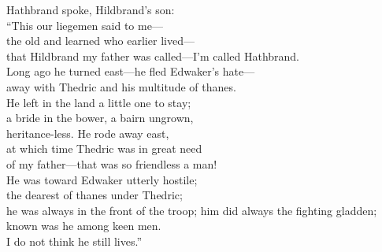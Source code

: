 \bvb Hathbrand spoke, Hildbrand’s son: \\
“This our liegemen said to me— \\
the old and learned who earlier lived— \\
that Hildbrand my father was called—I’m called Hathbrand. \\
Long ago he turned east—he fled Edwaker’s hate— \\
away with Thedric and his multitude of thanes. \\
He left in the land a little one to stay; \\
a bride in the bower, a bairn ungrown, \\
heritance-less. He rode away east, \\
at which time Thedric was in great need \\
of my father—that was so friendless a man! \\
He was toward Edwaker utterly hostile; \\
the dearest of thanes under Thedric; \\
he was always in the front of the troop; him did always the fighting gladden; \\
known was he among keen men. \\
I do not think he still lives.”\evb\evg


